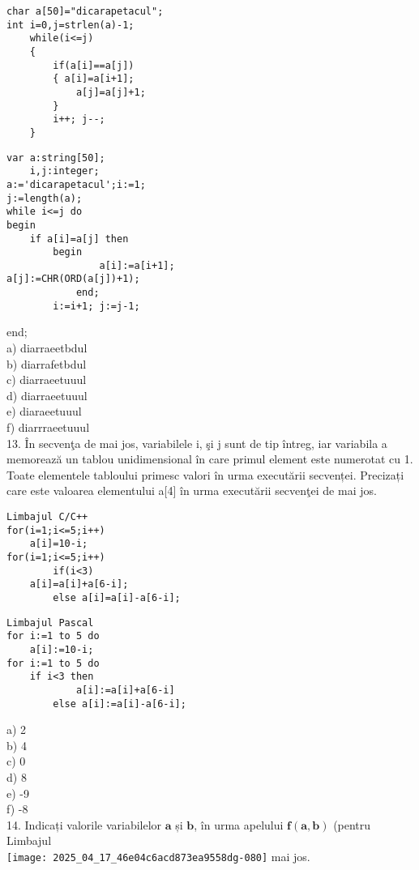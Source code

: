 \begin{verbatim}
char a[50]="dicarapetacul";
int i=0,j=strlen(a)-1;
    while(i<=j)
    {
        if(a[i]==a[j])
        { a[i]=a[i+1];
            a[j]=a[j]+1;
        }
        i++; j--;
    }
\end{verbatim}

\begin{verbatim}
var a:string[50];
    i,j:integer;
a:='dicarapetacul';i:=1;
j:=length(a);
while i<=j do
begin
    if a[i]=a[j] then
        begin
                a[i]:=a[i+1];
a[j]:=CHR(ORD(a[j])+1);
            end;
        i:=i+1; j:=j-1;
\end{verbatim}

end;\\
a) diarraeetbdul\\
b) diarrafetbdul\\
c) diarraeetuuul\\
d) diarraeetuuul\\
e) diaraeetuuul\\
f) diarrraeetuuul\\[0pt]
13. În secvenţa de mai jos, variabilele i, şi j sunt de tip întreg, iar variabila a memorează un tablou unidimensional în care primul element este numerotat cu 1. Toate elementele tabloului primesc valori în urma executării secvenței. Precizați care este valoarea elementului a[4] în urma executării secvenţei de mai jos.

\begin{verbatim}
Limbajul C/C++
for(i=1;i<=5;i++)
    a[i]=10-i;
for(i=1;i<=5;i++)
        if(i<3)
    a[i]=a[i]+a[6-i];
        else a[i]=a[i]-a[6-i];
\end{verbatim}

\begin{verbatim}
Limbajul Pascal
for i:=1 to 5 do
    a[i]:=10-i;
for i:=1 to 5 do
    if i<3 then
            a[i]:=a[i]+a[6-i]
        else a[i]:=a[i]-a[6-i];
\end{verbatim}

a) 2\\
b) 4\\
c) 0\\
d) 8\\
e) -9\\
f) -8\\
14. Indicați valorile variabilelor $\mathbf{a}$ și $\mathbf{b}$, în urma apelului $\mathbf{f ( a , b )}$ (pentru Limbajul\\
\texttt{[image: 2025\_04\_17\_46e04c6acd873ea9558dg-080]} mai jos.

